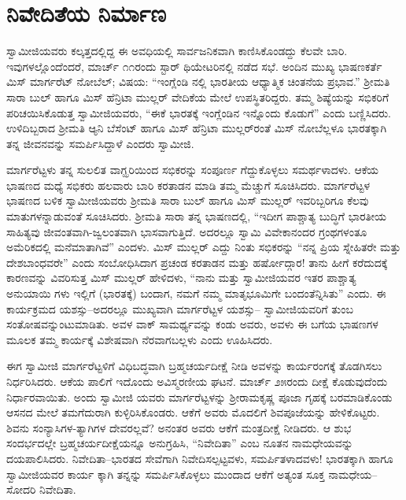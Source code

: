 
\chapter{ನಿವೇದಿತೆಯ ನಿರ್ಮಾಣ}

\noindent

ಸ್ವಾಮೀಜಿಯವರು ಕಲ್ಕತ್ತದಲ್ಲಿದ್ದ ಈ ಅವಧಿಯಲ್ಲಿ ಸಾರ್ವಜನಿಕವಾಗಿ ಕಾಣಿಸಿಕೊಂಡದ್ದು ಕೆಲವೇ ಬಾರಿ. ಇವುಗಳಲ್ಲೊಂದೆಂದರೆ, ಮಾರ್ಚ್ ೧೧ರಂದು ಸ್ಟಾರ್ ಥಿಯೇಟರಿನಲ್ಲಿ ನಡೆದ ಸಭೆ. ಅಂದಿನ ಮುಖ್ಯ ಭಾಷಣಕರ್ತೆ ಮಿಸ್ ಮಾರ್ಗರೆಟ್ ನೋಬೆಲ್; ವಿಷಯ: “ಇಂಗ್ಲೆಂಡಿ ನಲ್ಲಿ ಭಾರತೀಯ ಆಧ್ಯಾತ್ಮಿಕ ಚಿಂತನೆಯ ಪ್ರಭಾವ.” ಶ್ರೀಮತಿ ಸಾರಾ ಬುಲ್ ಹಾಗೂ ಮಿಸ್ ಹೆನ್ರಿಟಾ ಮುಲ್ಲರ್ ವೇದಿಕೆಯ ಮೇಲೆ ಉಪಸ್ಥಿತರಿದ್ದರು. ತಮ್ಮ ಶಿಷ್ಯೆಯನ್ನು ಸಭಿಕರಿಗೆ ಪರಿಚಯಿಸಿಕೊಡುತ್ತ ಸ್ವಾಮೀಜಿಯವರು, “ಈಕೆ ಭಾರತಕ್ಕೆ ಇಂಗ್ಲೆಂಡಿನ ಇನ್ನೊಂದು ಕೊಡುಗೆ” ಎಂದು ಬಣ್ಣಿಸಿದರು. ಉಳಿದಿಬ್ಬರಾದ ಶ್ರೀಮತಿ ಆ್ಯನಿ ಬೆಸೆಂಟ್ ಹಾಗೂ ಮಿಸ್ ಹೆನ್ರಿಟಾ ಮುಲ್ಲರ್​ರಂತೆ ಮಿಸ್ ನೋಬೆಲ್ಲಳೂ ಭಾರತಕ್ಕಾಗಿ ತನ್ನ ಜೀವನವನ್ನು ಸಮರ್ಪಿಸಿದ್ದಾಳೆ ಎಂದರು ಸ್ವಾಮೀಜಿ.

ಮಾರ್ಗರೆಟ್ಟಳು ತನ್ನ ಸುಲಲಿತ ವಾಗ್ಝರಿಯಿಂದ ಸಭಿಕರನ್ನು ಸಂಪೂರ್ಣ ಗೆದ್ದುಕೊಳ್ಳಲು ಸಮರ್ಥಳಾದಳು. ಆಕೆಯ ಭಾಷಣದ ಮಧ್ಯೆ ಸಭಿಕರು ಹಲವಾರು ಬಾರಿ ಕರತಾಡನ ಮಾಡಿ ತಮ್ಮ ಮೆಚ್ಚುಗೆ ಸೂಚಿಸಿದರು. ಮಾರ್ಗರೆಟ್ಟಳ ಭಾಷಣದ ಬಳಿಕ ಸ್ವಾಮೀಜಿಯವರು ಶ್ರೀಮತಿ ಸಾರಾ ಬುಲ್ ಹಾಗೂ ಮಿಸ್ ಮುಲ್ಲರ್ ಇವರಿಬ್ಬರಿಗೂ ಕೆಲವು ಮಾತುಗಳನ್ನಾಡುವಂತೆ ಸೂಚಿಸಿದರು. ಶ್ರೀಮತಿ ಸಾರಾ ತನ್ನ ಭಾಷಣದಲ್ಲಿ, “ಇದೀಗ ಪಾಶ್ಚಾತ್ಯ ಬುದ್ಧಿಗೆ ಭಾರತೀಯ ಸಾಹಿತ್ಯವು ಜೀವಂತವಾಗಿ-ಜ್ವಲಂತವಾಗಿ ಭಾಸವಾಗುತ್ತಿದೆ. ಅದರಲ್ಲೂ ಸ್ವಾಮಿ ವಿವೇಕಾನಂದರ ಗ್ರಂಥಗಳಂತೂ ಅಮೆರಿಕದಲ್ಲಿ ಮನೆಮಾತಾಗಿವೆ” ಎಂದಳು. ಮಿಸ್ ಮುಲ್ಲರ್ ಎದ್ದು ನಿಂತು ಸಭಿಕರನ್ನು “ನನ್ನ ಪ್ರಿಯ ಸ್ನೇಹಿತರೇ ಮತ್ತು ದೇಶಬಾಂಧವರೇ” ಎಂದು ಸಂಬೋಧಿಸಿದಾಗ ಪ್ರಚಂಡ ಕರತಾಡನ ಮತ್ತು ಹರ್ಷೋದ್ಗಾರ! ತಾನು ಹೀಗೆ ಕರೆದುದಕ್ಕೆ ಕಾರಣವನ್ನು ವಿವರಿಸುತ್ತ ಮಿಸ್ ಮುಲ್ಲರ್ ಹೇಳಿದಳು, “ನಾನು ಮತ್ತು ಸ್ವಾಮೀಜಿಯವರ ಇತರ ಪಾಶ್ಚಾತ್ಯ ಅನುಯಾಯಿ ಗಳು ಇಲ್ಲಿಗೆ (ಭಾರತಕ್ಕೆ) ಬಂದಾಗ, ನಮಗೆ ನಮ್ಮ ಮಾತೃಭೂಮಿಗೇ ಬಂದಂತೆನ್ನಿಸಿತು” ಎಂದು. ಈ ಕಾರ್ಯಕ್ರಮದ ಯಶಸ್ಸು–ಅದರಲ್ಲೂ ಮುಖ್ಯವಾಗಿ ಮಾರ್ಗರೆಟ್ಟಳ ಯಶಸ್ಸು– ಸ್ವಾಮೀಜಿಯವರಿಗೆ ತುಂಬ ಸಂತೋಷವನ್ನುಂಟುಮಾಡಿತು. ಅವಳ ವಾಕ್ ಸಾಮರ್ಥ್ಯವನ್ನು ಕಂಡು ಅವರು, ಅವಳು ಈ ಬಗೆಯ ಭಾಷಣಗಳ ಮೂಲಕ ತಮ್ಮ ಕಾರ್ಯಕ್ಕೆ ವಿಶೇಷವಾಗಿ ನೆರವಾಗಬಲ್ಲಳು ಎಂದು ಊಹಿಸಿದರು.

ಈಗ ಸ್ವಾಮೀಜಿ ಮಾರ್ಗರೆಟ್ಟಳಿಗೆ ವಿಧಿಬದ್ಧವಾಗಿ ಬ್ರಹ್ಮಚರ್ಯದೀಕ್ಷೆ ನೀಡಿ ಅವಳನ್ನು ಕಾರ್ಯರಂಗಕ್ಕೆ ತೊಡಗಿಸಲು ನಿರ್ಧರಿಸಿದರು. ಆಕೆಯ ಪಾಲಿಗೆ ಇದೊಂದು ಅವಿಸ್ಮರಣೀಯ ಘಟನೆ. ಮಾರ್ಚ್ ೨೫ರಂದು ದೀಕ್ಷೆ ಕೊಡುವುದೆಂದು ನಿರ್ಧಾರವಾಯಿತು. ಅಂದು ಸ್ವಾಮೀಜಿ ಯವರು ಮಾರ್ಗರೆಟ್ಟಳನ್ನು ಶ್ರೀರಾಮಕೃಷ್ಣ ಪೂಜಾ ಗೃಹಕ್ಕೆ ಬರಮಾಡಿಕೊಂಡು ಆಸನದ ಮೇಲೆ ತಮಗೆದುರಾಗಿ ಕುಳ್ಳಿರಿಸಿಕೊಂಡರು. ಆಕೆಗೆ ಅವರು ಮೊದಲಿಗೆ ಶಿವಪೂಜೆಯನ್ನು ಹೇಳಿಕೊಟ್ಟರು. ಶಿವನು ಸಂನ್ಯಾಸಿಗಳ-ತ್ಯಾಗಿಗಳ ದೇವರಲ್ಲವೆ? ಅನಂತರ ಅವರು ಆಕೆಗೆ ಮಂತ್ರದೀಕ್ಷೆ ನೀಡಿದರು. ಆ ಶುಭ ಸಂದರ್ಭದಲ್ಲೇ ಬ್ರಹ್ಮಚರ್ಯದೀಕ್ಷೆಯನ್ನೂ ಅನುಗ್ರಹಿಸಿ, “ನಿವೇದಿತಾ” ಎಂಬ ನೂತನ ನಾಮಧೇಯವನ್ನು ದಯಪಾಲಿಸಿದರು. ನಿವೇದಿತಾ–ಭಾರತದ ಸೇವೆಗಾಗಿ ನಿವೇದಿಸಲ್ಪಟ್ಟವಳು, ಸಮರ್ಪಿತಳಾದವಳು! ಭಾರತಕ್ಕಾಗಿ ಹಾಗೂ ಸ್ವಾಮೀಜಿಯವರ ಕಾರ್ಯ ಕ್ಕಾಗಿ ತನ್ನನ್ನು ಸಮರ್ಪಿಸಿಕೊಳ್ಳಲು ಮುಂದಾದ ಆಕೆಗೆ ಅತ್ಯಂತ ಸೂಕ್ತ ನಾಮಧೇಯ–ಸೋದರಿ ನಿವೇದಿತಾ.

